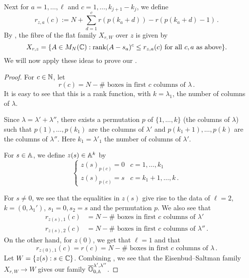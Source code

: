 \documentclass{article}
\begin{document}
Next for $ a = 1, \dots, \ell $ and $ c = 1, \dots, k_{j+1} - k_j$, we define
$$
    r_{z,a}(c):= N + \sum_{d = 1}^c r(p(k_a + d)) - r(p(k_a + d) - 1)  \, . 
$$
By \cite[Corollary 2.2]{eisenbud1989rank}, the fibre of the flat family $ X_{r,W} $ over $ z$ is given by
\begin{equation} 
    \label{eq:ESfibre}
    X_{r,z} = \{ A \in M_N(\CC) :\rk (A-s_a)^c\le r_{z,a}(c) \text{ for all } c , a \text{ as above}\}.
\end{equation}
% 
We will now apply these ideas to prove our .
% 
\begin{proof}
% 
For $ c\in \NN$, let
$$
    r(c) = N - \#\text{~boxes in first $c$ columns of }\lambda\,.
$$
It is easy to see that this is a rank function, with $ k = \lambda_1$, the number of columns of $ \lambda$.

Since $\lambda = \lambda' + \lambda''$, there exists a permutation $ p $ of $ \{1, \dots, k\}$ (the columns of $ \lambda$) such that $ p(1), \dots, p(k_1) $ are the columns of $ \lambda'$ and $ p(k_1+1), \dots, p(k)$ are the columns of $ \lambda''$. Here $ k_1 = \lambda'_1$ the number of columns of $ \lambda'$.

For $ s \in \AA$, we define $ z(s) \in \AA^k$ by 
\[
\begin{cases}
    z(s)_{p(c)} = 0 &  c = 1, \dots, k_1 \\
    z(s)_{p(c)} = s &  c = k_1 + 1, \dots, k\,.
\end{cases}    
\]

For $ s \ne 0$, we see that the equalities in $ z(s) $ give rise to the data of \(\ell = 2\), \(k = (0,\lambda_1')\), \(s_1 = 0, s_2 = s\) and the permutation $p$.
We also see that
\begin{equation} 
\label{eq:rcols}
    \begin{split}
            r_{z(s), 1}(c) &=  N - \#\text{~boxes in first $c$ columns of }\lambda' \\
            r_{z(s), 2}(c) &=  N - \#\text{~boxes in first $c$ columns of }\lambda'' \,. 
    \end{split}
\end{equation}
On the other hand, for $z(0)$, we get that $ \ell = 1$ and that 
\begin{equation} 
\label{eq:rcol2}
    r_{z(0),1}(c) = 
    r(c) = N - \#\text{~boxes in first $c$ columns of }\lambda\,. 
\end{equation}
% 
Let $ W = \{ z(s) : s \in \CC \}$. Combining , we see that the Eisenbud--Saltman family $ X_{r, W} \rightarrow W $ gives our family $ \overline{\OO}^{\lambda', \lambda''}_{0, \AA}$.
\end{proof}
% 
\end{document}

